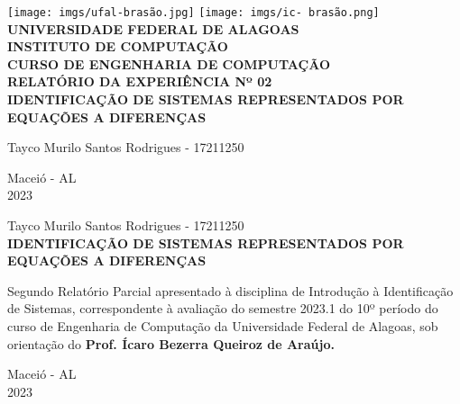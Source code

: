 \documentclass[a4paper,12pt]{article}
\begin{document}
\begin{center}
    \thispagestyle{empty}
    \texttt{[image: imgs/ufal-brasão.jpg]}\quad
    \texttt{[image: imgs/ic- brasão.png]}\\
    \large
        \textbf{UNIVERSIDADE FEDERAL DE ALAGOAS}\\
        \textbf{INSTITUTO DE COMPUTAÇÃO}\\
        \textbf{CURSO DE ENGENHARIA DE COMPUTAÇÃO}\\
        \vspace{4cm}
        \textbf{RELATÓRIO DA EXPERIÊNCIA Nº 02}\\
        \textbf{IDENTIFICAÇÃO DE SISTEMAS REPRESENTADOS POR EQUAÇÕES A DIFERENÇAS}\\
        \vspace{4cm}
        \begin{flushright}
            {Tayco Murilo Santos Rodrigues - 17211250}\\
        \end{flushright}
        \vspace{8cm}
        Maceió - AL\\
        2023
\end{center}

\newpage
\begin{center}
    \thispagestyle{empty}
    \large
        Tayco Murilo Santos Rodrigues - 17211250\\
    \vspace{5cm}
    \textbf{IDENTIFICAÇÃO DE SISTEMAS REPRESENTADOS POR EQUAÇÕES A DIFERENÇAS}\\
    \vspace{4cm}
    \begin{flushright}
        \begin{minipage}{ 7.5 cm }
            \normalsize
            Segundo Relatório Parcial apresentado à disciplina de
            Introdução à Identificação de Sistemas, correspondente à
            avaliação do semestre 2023.1 do 10º período do curso de
            Engenharia de Computação da Universidade Federal de
            Alagoas, sob orientação do \textbf{Prof. Ícaro Bezerra Queiroz
            de Araújo.}
        \end{minipage}
    \end{flushright}
    \vspace{8cm}
    Maceió - AL\\
    2023
\end{center}
\end{document}
